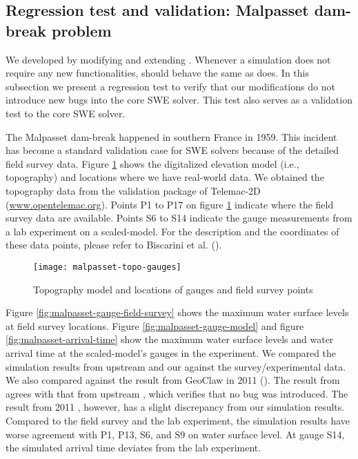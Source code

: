 \subsection{Regression test and validation: Malpasset dam-break problem}

We developed \geoclawlandspill{} by modifying and extending \geoclaw{}.
Whenever a simulation does not require any new functionalities, \geoclawlandspill{} should behave the same as \geoclaw{} does.
In this subsection we present a regression test to verify that our modifications do not introduce new bugs into the core SWE solver.
This test also serves as a validation test to the core SWE solver.

The Malpasset dam-break happened in southern France in 1959.
This incident has become a standard validation case for SWE solvers because of the detailed field survey data.
Figure \ref{fig:malpasset-topo-gauges} shows the digitalized elevation model (i.e., topography) and locations where we have real-world data.
We obtained the topography data from the validation package of Telemac-2D (\url{www.opentelemac.org}).
Points P1 to P17 on figure \ref{fig:malpasset-topo-gauges} indicate where the field survey data are available.
Points S6 to S14 indicate the gauge measurements from a lab experiment on a scaled-model.
For the description and the coordinates of these data points, please refer to Biscarini et al. (\cite{biscarini_simulation_2016}).

\begin{figure}
    \centering
    \texttt{[image: malpasset-topo-gauges]}
    \caption{Topography model and locations of gauges and field survey points}\label{fig:malpasset-topo-gauges}
\end{figure}

Figure \ref{fig:malpasset-gauge-field-survey} shows the maximum water surface levels at field survey locations.
Figure \ref{fig:malpasset-gauge-model} and figure \ref{fig:malpasset-arrival-time} show the maximum water surface levels and water arrival time at the scaled-model's gauges in the experiment.
We compared the simulation results from upstream \geoclaw{} and our \geoclawlandspill{} against the survey/experimental data.
We also compared against the result from GeoClaw in 2011 (\cite{George2011}).
The result from \geoclawlandspill{} agrees with that from upstream \geoclaw{}, which verifies that no bug was introduced.
The result from 2011 \geoclaw{}, however, has a slight discrepancy from our simulation results.
Compared to the field survey and the lab experiment, the simulation results have worse agreement with P1, P13, S6, and S9 on water surface level.
At gauge S14, the simulated arrival time deviates from the lab experiment.

